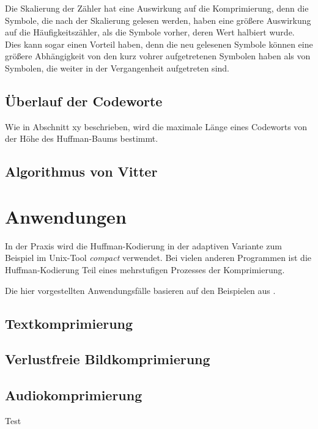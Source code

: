 \documentclass[twoside,11pt,a4paper]{article}
\theoremstyle{break}
\begin{document}
Die Skalierung der Zähler hat eine Auswirkung auf die Komprimierung,
denn die Symbole, die nach der Skalierung gelesen werden, haben eine
größere Auswirkung auf die Häufigkeitszähler, als die Symbole vorher,
deren Wert halbiert wurde.  Dies kann sogar einen Vorteil haben, denn
die neu gelesenen Symbole können eine größere Abhängigkeit von den
kurz vohrer aufgetretenen Symbolen haben als von Symbolen, die weiter
in der Vergangenheit aufgetreten sind.

\subsection{Überlauf der Codeworte}
Wie in Abschnitt xy beschrieben, wird die maximale Länge eines
Codeworts von der Höhe des Huffman-Baums bestimmt.


\subsection{Algorithmus von Vitter}

\section{Anwendungen}
In der Praxis wird die Huffman-Kodierung in der adaptiven Variante zum
Beispiel im Unix-Tool \emph{compact} verwendet. Bei vielen anderen
Programmen ist die Huffman-Kodierung Teil eines mehrstufigen Prozesses
der Komprimierung.


Die hier vorgestellten Anwendungsfälle basieren auf den Beispielen aus
\cite{Sayood:2006}.

\subsection{Textkomprimierung}

\subsection{Verlustfreie Bildkomprimierung}

\subsection{Audiokomprimierung}


Test \cite{Salomon:2010}  \cite{Williams:1991}



\end{document}
